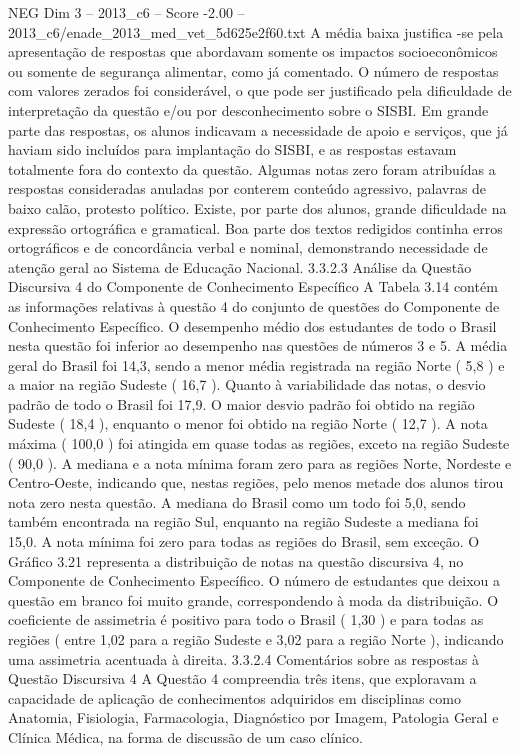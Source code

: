 \begin{textsample}{NEG Dim 3 – 2013\_c6 – Score -2.00 – 2013\_c6/enade\_2013\_med\_vet\_5d625e2f60.txt}
A média baixa justifica -se pela apresentação de respostas que abordavam somente os impactos socioeconômicos ou somente de segurança alimentar, como já comentado.
O número de respostas com valores zerados foi considerável, o que pode ser justificado pela dificuldade de interpretação da questão e/ou por desconhecimento sobre o SISBI.
Em grande parte das respostas, os alunos indicavam a necessidade de apoio e serviços, que já haviam sido incluídos para implantação do SISBI, e as respostas estavam totalmente fora do contexto da questão.
Algumas notas zero foram atribuídas a respostas consideradas anuladas por conterem conteúdo agressivo, palavras de baixo calão, protesto político.
Existe, por parte dos alunos, grande dificuldade na expressão ortográfica e gramatical.
Boa parte dos textos redigidos continha erros ortográficos e de concordância verbal e nominal, demonstrando necessidade de atenção geral ao Sistema de Educação Nacional. 3.3.2.3 Análise da Questão Discursiva 4 do Componente de Conhecimento Específico A Tabela 3.14 contém as informações relativas à questão 4 do conjunto de questões do Componente de Conhecimento Específico.
O desempenho médio dos estudantes de todo o Brasil nesta questão foi inferior ao desempenho nas questões de números 3 e 5.
A média geral do Brasil foi 14,3, sendo a menor média registrada na região Norte ( 5,8 ) e a maior na região Sudeste ( 16,7 ).
Quanto à variabilidade das notas, o desvio padrão de todo o Brasil foi 17,9.
O maior desvio padrão foi obtido na região Sudeste ( 18,4 ), enquanto o menor foi obtido na região Norte ( 12,7 ).
A nota máxima ( 100,0 ) foi atingida em quase todas as regiões, exceto na região Sudeste ( 90,0 ).
A mediana e a nota mínima foram zero para as regiões Norte, Nordeste e Centro-Oeste, indicando que, nestas regiões, pelo menos metade dos alunos tirou nota zero nesta questão.
A mediana do Brasil como um todo foi 5,0, sendo também encontrada na região Sul, enquanto na região Sudeste a mediana foi 15,0.
A nota mínima foi zero para todas as regiões do Brasil, sem exceção.
O Gráfico 3.21 representa a distribuição de notas na questão discursiva 4, no Componente de Conhecimento Específico.
O número de estudantes que deixou a questão em branco foi muito grande, correspondendo à moda da distribuição.
O coeficiente de assimetria é positivo para todo o Brasil ( 1,30 ) e para todas as regiões ( entre 1,02 para a região Sudeste e 3,02 para a região Norte ), indicando uma assimetria acentuada à direita. 3.3.2.4 Comentários sobre as respostas à Questão Discursiva 4 A Questão 4 compreendia três itens, que exploravam a capacidade de aplicação de conhecimentos adquiridos em disciplinas como Anatomia, Fisiologia, Farmacologia, Diagnóstico por Imagem, Patologia Geral e Clínica Médica, na forma de discussão de um caso clínico.

\end{textsample}
